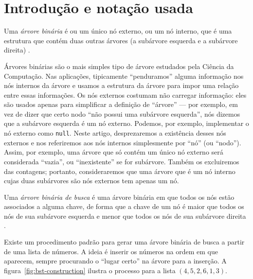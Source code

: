 \section{Introdução e notação usada}

\begin{definition}
    Uma \emph{árvore binária}
    é ou um único nó externo,
    ou um nó interno,
    que é uma estrutura que contém duas outras árvores
    (a subárvore esquerda e a subárvore direita)
    \cite[p.~257]{SedgewickFlajolet2013}.
\end{definition}

Árvores binárias são o mais simples tipo de árvore
estudados pela Ciência da Computação.
Nas aplicações,
tipicamente ``penduramos'' alguma informação nos nós internos da árvore
e usamos a estrutura da árvore para impor uma relação entre essas informações.
Os nós externos costumam não carregar informação:
eles são usados apenas para simplificar a definição de ``árvore''
--- por exemplo,
em vez de dizer que certo nodo ``não possui uma subárvore esquerda'',
nós dizemos que a subárvore esquerda é um nó externo.
Podemos, por exemplo,
implementar o nó externo como \texttt{null}.
Neste artigo,
desprezaremos a existência desses nós externos
e nos referiremos aos nós internos simplesmente por ``nó'' (ou ``nodo'').
Assim, por exemplo,
uma árvore que só contém um único nó externo
será considerada ``vazia'', ou ``inexistente'' se for subárvore.
Também os excluiremos das contagens;
portanto, consideraremos que
uma árvore que é um nó interno cujas duas subárvores são nós externos
tem apenas um nó.

\begin{definition}
    Uma \emph{árvore binária de busca}
    é uma árvore binária em que
    todos os nós estão associados a alguma chave,
    de forma que a chave de um nó
    é maior que todos os nós de sua subárvore esquerda
    e menor que todos os nós de sua subárvore direita
    \cite[p.~282]{SedgewickFlajolet2013}.
\end{definition}

Existe um procedimento padrão para gerar uma árvore binária de busca
a partir de uma lista de números.
A ideia é inserir os números na ordem em que aparecem,
sempre procurando o ``lugar certo'' na árvore para a inserção.
A figura~\ref{fig:bst-construction} ilustra o processo para a lista $(4, 5, 2, 6, 1, 3)$.

